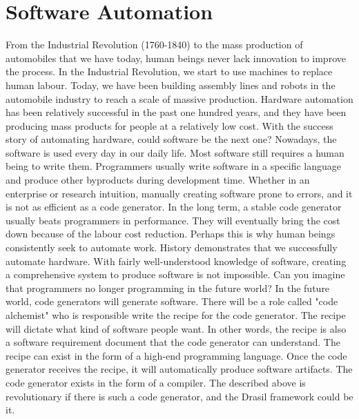 \chapter{Software Automation}
From the Industrial Revolution (1760-1840) to the mass production of automobiles that we have today, human beings never lack innovation to improve the process. In the Industrial Revolution, we start to use machines to replace human labour. Today, we have been building assembly lines and robots in the automobile industry to reach a scale of massive production. Hardware automation has been relatively successful in the past one hundred years, and they have been producing mass products for people at a relatively low cost. With the success story of automating hardware, could software be the next one? Nowadays, the software is used every day in our daily life. Most software still requires a human being to write them. Programmers usually write software in a specific language and produce other byproducts during development time. Whether in an enterprise or research intuition, manually creating software prone to errors, and it is not as efficient as a code generator. In the long term, a stable code generator usually beats programmers in performance. They will eventually bring the cost down because of the labour cost reduction. Perhaps this is why human beings consistently seek to automate work. History demonstrates that we successfully automate hardware. With fairly well-understood knowledge of software, creating a comprehensive system to produce software is not impossible. Can you imagine that programmers no longer programming in the future world? In the future world, code generators will generate software. There will be a role called "code alchemist" who is responsible write the recipe for the code generator. The recipe will dictate what kind of software people want. In other words, the recipe is also a software requirement document that the code generator can understand. The recipe can exist in the form of a high-end programming language. Once the code generator receives the recipe, it will automatically produce software artifacts. The code generator exists in the form of a compiler. The described above is revolutionary if there is such a code generator, and the Drasil framework could be it.